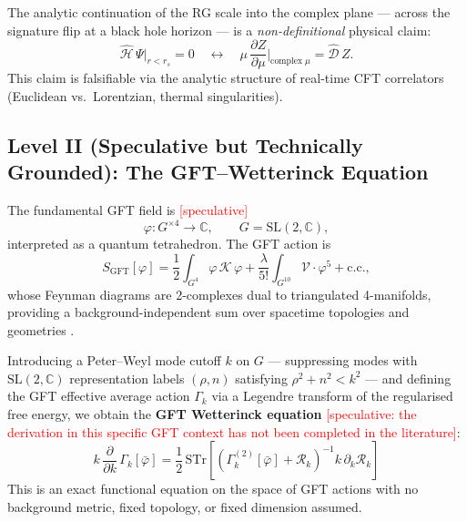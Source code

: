 \documentclass[11pt,a4paper]{article}
\begin{document}
The analytic continuation of the RG scale into the complex plane --- across the signature
flip at a black hole horizon --- is a \emph{non-definitional} physical claim:
\begin{equation}
  \hat{\mathcal{H}}\,\Psi\big|_{r < r_{s}} = 0
  \quad\longleftrightarrow\quad
  \mu\,\frac{\partial Z}{\partial\mu}\bigg|_{\mathrm{complex}\;\mu}
  = \hat{\mathcal{D}}\,Z.
  \label{eq:analytic_continuation}
\end{equation}
This claim is falsifiable via the analytic structure of real-time CFT correlators
(Euclidean vs.\ Lorentzian, thermal singularities).

\subsection{Level II (Speculative but Technically Grounded): The GFT--Wetterinck Equation}
\label{sec:levelII}

The fundamental GFT field is \textcolor{red}{[speculative]}
\begin{equation}
  \varphi : G^{\times 4} \to \mathbb{C},
  \qquad G = \mathrm{SL}(2,\mathbb{C}),
  \label{eq:GFT_field}
\end{equation}
interpreted as a quantum tetrahedron.  The GFT action is
\begin{equation}
  S_{\mathrm{GFT}}[\varphi]
  = \frac{1}{2}\int_{G^{4}}\varphi\,\mathcal{K}\,\varphi
  + \frac{\lambda}{5!}\int_{G^{10}}\mathcal{V}\cdot\varphi^{5}
  + \mathrm{c.c.},
  \label{eq:GFT_action}
\end{equation}
whose Feynman diagrams are 2-complexes dual to triangulated 4-manifolds, providing
a background-independent sum over spacetime topologies and geometries \cite{ashtekar2004}.

Introducing a Peter--Weyl mode cutoff $k$ on $G$ --- suppressing modes with
$\mathrm{SL}(2,\mathbb{C})$ representation labels $(\rho,n)$ satisfying
$\rho^{2}+n^{2}<k^{2}$ --- and defining the GFT effective average action $\Gamma_{k}$ via
a Legendre transform of the regularised free energy, we obtain the
\textbf{GFT Wetterinck equation} \textcolor{red}{[speculative: the derivation in this
specific GFT context has not been completed in the literature]}:
\begin{equation}
  \boxed{
    k\,\frac{\partial}{\partial k}\,\Gamma_{k}[\bar{\varphi}]
    = \frac{1}{2}\,\mathrm{STr}\!\left[
      \left(\Gamma_{k}^{(2)}[\bar{\varphi}]+\mathcal{R}_{k}\right)^{-1}
      k\,\partial_{k}\mathcal{R}_{k}
    \right]
  }
  \label{eq:GFT_Wetterinck}
\end{equation}
This is an exact functional equation on the space of GFT actions with no background metric,
fixed topology, or fixed dimension assumed.
\end{document}
